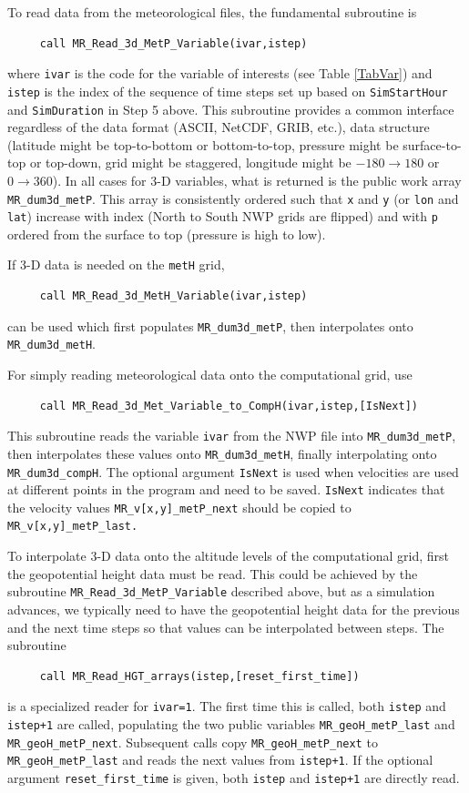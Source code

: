 \documentclass[11pt]{article}   %
\begin{document}
To read data from the meteorological files, the fundamental subroutine is
\begin{verbatim}
     call MR_Read_3d_MetP_Variable(ivar,istep)
\end{verbatim}
where \texttt{ivar} is the code for the variable of interests
(see Table \ref{TabVar}) and
\texttt{istep} is the index of the sequence of time steps set up based on
\texttt{SimStartHour} and \texttt{SimDuration} in Step 5 above.  This subroutine provides
a common interface regardless of the data format (ASCII, NetCDF, GRIB, etc.), data
structure (latitude might be top-to-bottom or bottom-to-top, pressure might be surface-to-top
or top-down, grid might be staggered, longitude might be $-180 \rightarrow 180$ or $0 \rightarrow 360$).
In all cases for 3-D variables, what is returned is the public work array
\texttt{MR\_dum3d\_metP}.
This array is consistently ordered such that \texttt{x}
and \texttt{y} (or \texttt{lon} and \texttt{lat}) increase with index (North to South NWP grids
are flipped) and with \texttt{p} ordered from the surface to top (pressure is high to low).

If 3-D data is needed on the \texttt{metH} grid,
\begin{verbatim}
     call MR_Read_3d_MetH_Variable(ivar,istep)
\end{verbatim}
can be used which first populates \texttt{MR\_dum3d\_metP}, then interpolates
onto \texttt{MR\_dum3d\_metH}.

For simply reading meteorological data onto the computational grid, use
\begin{verbatim}
     call MR_Read_3d_Met_Variable_to_CompH(ivar,istep,[IsNext])
\end{verbatim}
This subroutine reads the variable \texttt{ivar} from the NWP file into
\texttt{MR\_dum3d\_metP}, then interpolates these values onto \texttt{MR\_dum3d\_metH},
finally interpolating onto \texttt{MR\_dum3d\_compH}.  The optional argument
\texttt{IsNext} is used when velocities are used at different points in the program
and need to be saved.  \texttt{IsNext} indicates that the velocity values
\texttt{MR\_v[x,y]\_metP\_next} should be copied to \texttt{MR\_v[x,y]\_metP\_last.}

To interpolate 3-D data onto the altitude levels of the computational grid, first
the geopotential height data must be read.  This could be achieved by the subroutine
\texttt{MR\_Read\_3d\_MetP\_Variable} described above, but as a simulation advances, we
typically need to have the geopotential height data for the previous and the next time
steps so that values can be interpolated between steps.  The subroutine
\begin{verbatim}
     call MR_Read_HGT_arrays(istep,[reset_first_time])
\end{verbatim}
is a specialized reader for \texttt{ivar=1}.  The first time this is called, both
\texttt{istep} and \texttt{istep+1} are called, populating the two public variables
\texttt{MR\_geoH\_metP\_last} and \texttt{MR\_geoH\_metP\_next}.  Subsequent calls
copy \texttt{MR\_geoH\_metP\_next} to \texttt{MR\_geoH\_metP\_last} and reads
the next values from \texttt{istep+1}.  If the optional argument \texttt{reset\_first\_time}
is given, both \texttt{istep} and \texttt{istep+1} are directly read.
\end{document}
